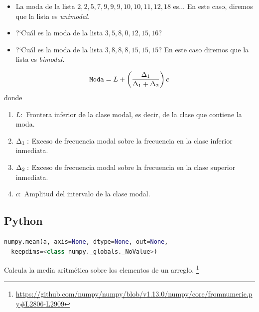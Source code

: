  
  \begin{ejemplo}
   \begin{itemize}
    \item La moda de la lista $2,2,5,7,9,9,9,10,10,11,12,18$ es...  En este caso, diremos que la lista es \emph{unimodal.}
    \item ?`Cuál es la moda de la lista $3,5,8,0,12,15,16$? 
    \item ?`Cuál es la moda de la lista $3,8,8,8,15,15,15$?  En este caso diremos que la lista es \emph{bimodal.}
   \end{itemize}

  \end{ejemplo}

 
 
  \begin{defn}
   \begin{align}
    \texttt{Moda}=
    L + \left( \dfrac{\Delta_{1}}{\Delta_{1}+\Delta_{2}} \right)c
   \end{align}
 donde 
 \begin{enumerate}
  \item $L:$ Frontera inferior de la clase modal, es decir, de la clase que contiene la moda.
  \item $\Delta_{1}:$ Exceso de frecuencia modal sobre la frecuencia en la clase inferior inmediata. 
  \item $\Delta_{2}:$ Exceso de frecuencia modal sobre la frecuencia en la clase superior inmediata. 
  \item $c:$ Amplitud del intervalo de la clase modal.
 \end{enumerate}

  \end{defn}

 

\subsection{Python}

\begin{lstlisting}[language=Python]
 numpy.mean(a, axis=None, dtype=None, out=None,
  keepdims=<class numpy._globals._NoValue>)
\end{lstlisting}

Calcula  la media aritmética sobre los elementos de un arreglo. \footnote{\href{https://github.com/numpy/numpy/blob/v1.13.0/numpy/core/fromnumeric.py\#L2806-L2909}{https://github.com/numpy/numpy/blob/v1.13.0/numpy/core/fromnumeric.py\#L2806-L2909}}


